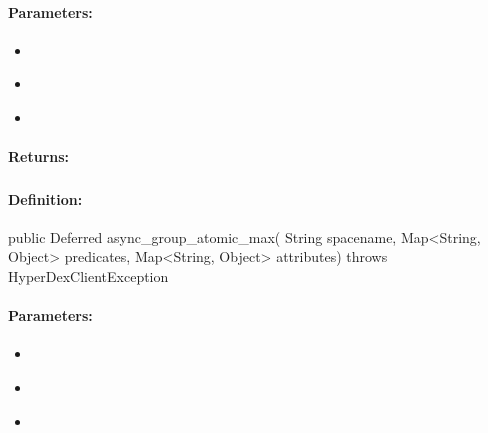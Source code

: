 \paragraph{Parameters:}
\begin{itemize}[noitemsep]
\item {}\\

\item {}\\

\item {}\\

\end{itemize}

\paragraph{Returns:}


\pagebreak
\subsubsection{}
\label{api:java:async_group_atomic_max}


\paragraph{Definition:}
\begin{javacode}
public Deferred async_group_atomic_max(
        String spacename,
        Map<String, Object> predicates,
        Map<String, Object> attributes) throws HyperDexClientException
\end{javacode}

\paragraph{Parameters:}
\begin{itemize}[noitemsep]
\item {}\\

\item {}\\

\item {}\\

\end{itemize}


